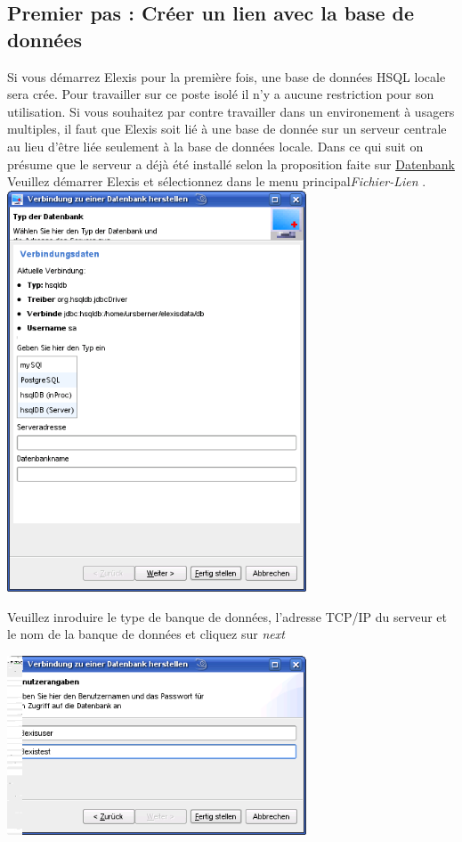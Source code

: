 \subsection{Premier pas : Créer un lien avec la base de données}
Si vous démarrez Elexis pour la première fois, une base de données HSQL locale sera crée. Pour travailler sur ce poste isolé il n'y a aucune restriction pour son utilisation. Si vous souhaitez par contre travailler dans un environement à usagers multiples, il faut que Elexis soit lié à une base de donnée sur un serveur centrale au lieu d'être liée seulement à la base de données locale. Dans ce qui suit on présume que le serveur a déjà été installé selon la proposition faite sur
\href{http://www.elexis.ch/jp/index.php?option=content&task=view&id=72}{Datenbank}
Veuillez démarrer Elexis et sélectionnez dans le menu principal\textit{Fichier-Lien} . 
\includegraphics[width=3.5in]{images/verb1.png}

Veuillez inroduire le type de banque de données, l'adresse TCP/IP du serveur et le nom de la banque de données et cliquez sur \textit{next}

\includegraphics[width=3.5in]{images/verb2.png}

